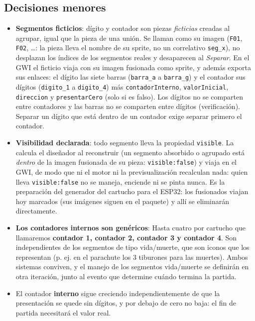 \subsection{Decisiones menores}
\label{subsec:DecisionesF3I10}

\begin{itemize}
	\item \textbf{Segmentos ficticios}: dígito y contador son piezas
	\emph{ficticias} creadas al agrupar, igual que la pieza de una unión.
	Se llaman como su imagen (\texttt{F01}, \texttt{F02}, \dots: la pieza
	lleva el nombre de su sprite, no un correlativo \texttt{seg\_x}), no
	desplazan los índices de los segmentos reales y desaparecen al
	\emph{Separar}. En el GWI el ficticio viaja con su imagen fusionada como
	sprite, y además exporta sus enlaces: el dígito las siete barras
	(\texttt{barra\_a} a \texttt{barra\_g}) y el contador sus dígitos
	(\texttt{digito\_1} a \texttt{digito\_4}) más
	\texttt{contadorInterno}, \texttt{valorInicial},
	\texttt{direccion} y \texttt{presentarCero} (solo si es falso). Los
	dígitos no se comparten entre contadores y las barras no se comparten
	entre dígitos (verificación). Separar un dígito que está dentro de un
	contador exige separar primero el contador.
	
	\item \textbf{Visibilidad declarada}: todo segmento lleva la propiedad
	\texttt{visible}. La calcula el diseñador al reconstruir (un segmento
	absorbido o agrupado está \emph{dentro} de la imagen fusionada de su
	pieza: \texttt{visible:false}) y viaja en el GWI, de modo que ni el
	motor ni la previsualización recalculan nada: quien lleva
	\texttt{visible:false} no se maneja, enciende ni se pinta nunca. Es la
	preparación del generador del cartucho para el ESP32: los fusionados
	viajan hoy marcados (sus imágenes siguen en el paquete) y allí se
	eliminarán directamente.
	
	\item \textbf{Los contadores internos son genéricos}: Hasta cuatro por cartucho que llamaremos \textbf{contador 1, contador 2, contador 3 y contador 4}. Son
	independientes de los segmentos de tipo vida/muerte, que son 
	iconos que los representan (p. ej. en el parachute los 3 tiburones para las muertes).
	Ambos sistemas conviven, y el manejo de los segmentos
	vida/muerte se definirán en otra iteración, junto al evento que determine
	cuándo termina la partida.
	
	\item El contador \textbf{interno} sigue creciendo independientemente de que
	la presentación se quede sin dígitos, y por debajo de cero no baja: el fin
	de partida necesitará el valor real.
	

\end{itemize}
